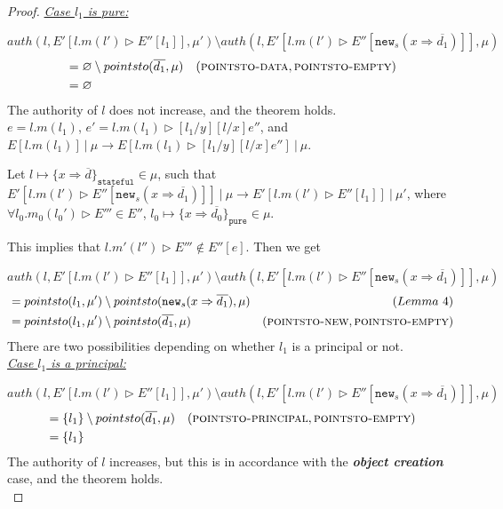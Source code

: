 \documentclass{llncs}
\newcommand{\keywadj}[1]{\mathtt{#1}}
\begin{document}
\begin{proof}
\noindent\underline{\textit{Case $l_1$ is pure:}}

\noindent$auth(l, E'[l.m(l') \rhd E''[l_1]], \mu') \setminus auth(l, E'[l.m(l') \rhd E''[\keywadj{new}_s(x \Rightarrow \overline{d_1})]], \mu)$
\vspace{-7pt}
\begin{align*}
&= \varnothing \setminus pointsto(\overline{d_1}, \mu) & (\textsc{pointsto-data}, \textsc{pointsto-empty})\\
&= \varnothing
\end{align*}
The authority of $l$ does not increase, and the theorem holds.\\


\noindent{}
$e = l.m(l_1)$, \mbox{$e' = l.m(l_1) \rhd [l_1 / y][l / x]e''$}, and \mbox{$E[l.m(l_1)]~|~\mu \longrightarrow E[l.m(l_1) \rhd [l_1 / y][l / x]e'']~|~\mu$}.

Let $l \mapsto \{ x \Rightarrow \overline{d} \}_{\keywadj{stateful}} \in \mu$, such that $E'[l.m(l') \rhd E''[\keywadj{new}_s(x \Rightarrow \overline{d_1})]]~|~\mu \longrightarrow E'[l.m(l') \rhd E''[l_1]]~|~\mu'$, where $\forall l_0.m_0(l_0') \rhd E''' \in E''$, $l_0 \mapsto \{ x \Rightarrow \overline{d_0}\}_{\keywadj{pure}} \in \mu$.

This implies that $l.m'(l'') \rhd E''' \not\in E''[e]$. Then we get

\noindent$auth(l, E'[l.m(l') \rhd E''[l_1]], \mu') \setminus auth(l, E'[l.m(l') \rhd E''[\keywadj{new}_s(x \Rightarrow \overline{d_1})]], \mu)$
\vspace{-7pt}
\begin{align*}
&= pointsto(l_1, \mu') \setminus pointsto(\keywadj{new}_s(x \Rightarrow \overline{d_1}), \mu) & (Lemma~4)\\
&= pointsto(l_1, \mu') \setminus pointsto(\overline{d_1}, \mu) & (\textsc{pointsto-new}, \textsc{pointsto-empty})
\end{align*}
There are two possibilities depending on whether $l_1$ is a principal or not.\\

\noindent\underline{\textit{Case $l_1$ is a principal:}}

\noindent$auth(l, E'[l.m(l') \rhd E''[l_1]], \mu') \setminus auth(l, E'[l.m(l') \rhd E''[\keywadj{new}_s(x \Rightarrow \overline{d_1})]], \mu)$
\vspace{-7pt}
\begin{align*}
&= \{ l_1 \} \setminus pointsto(\overline{d_1}, \mu) & (\textsc{pointsto-principal}, \textsc{pointsto-empty})\\
&= \{ l_1 \}
\end{align*}
The authority of $l$ increases, but this is in accordance with the \textbf{\textit{object creation}} case, and the theorem holds.\\


\end{proof}
\end{document}
